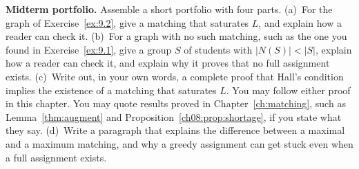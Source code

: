 \begin{exercise}\label{ex:9.6}\textbf{Midterm portfolio.} Assemble a short portfolio with four parts.
(a)~For the graph of Exercise~\ref{ex:9.2}, give a matching that saturates $L$, and explain how a reader can check it.
(b)~For a graph with no such matching, such as the one you found in Exercise~\ref{ex:9.1}, give a group $S$ of students with $|N(S)|<|S|$, explain how a reader can check it, and explain why it proves that no full assignment exists.
(c)~Write out, in your own words, a complete proof that Hall's condition implies the existence of a matching that saturates $L$. You may follow either proof in this chapter. You may quote results proved in Chapter~\ref{ch:matching}, such as Lemma~\ref{thm:augment} and Proposition~\ref{ch08:prop:shortage}, if you state what they say.
(d)~Write a paragraph that explains the difference between a maximal and a maximum matching, and why a greedy assignment can get stuck even when a full assignment exists.\end{exercise}
